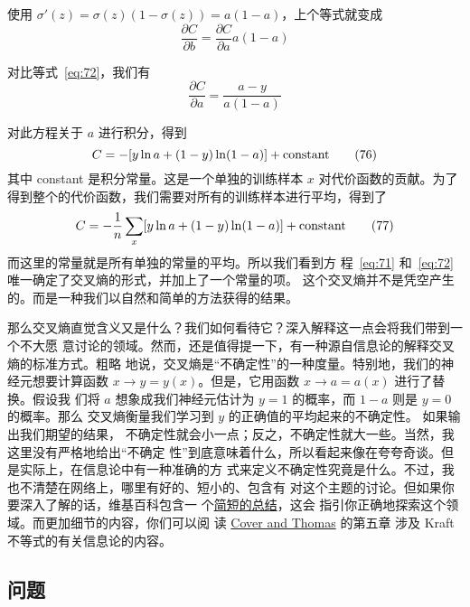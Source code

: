 使用 $\sigma'(z) = \sigma(z)(1-\sigma(z)) = a(1-a)$，上个等式就变成
\begin{equation}
  \frac{\partial C}{\partial b} = \frac{\partial C}{\partial a}
  a(1-a)
  \label{eq:74}\tag{74}
\end{equation}

对比等式~\eqref{eq:72}，我们有
\begin{equation}
  \frac{\partial C}{\partial a} = \frac{a-y}{a(1-a)}
  \label{eq:75}\tag{75}
\end{equation}

对此方程关于 $a$ 进行积分，得到
\begin{equation}
  C = -[y \ln a + (1-y) \ln (1-a)]+ {\rm constant}
  \label{eq:76}\tag{76}
\end{equation}
其中 {\rm constant} 是积分常量。这是一个单独的训练样本 $x$ 对代价函数的贡献。为了
得到整个的代价函数，我们需要对所有的训练样本进行平均，得到了
\begin{equation}
  C = -\frac{1}{n} \sum_x [y \ln a +(1-y) \ln(1-a)] + {\rm constant}
  \label{eq:77}\tag{77}
\end{equation}
而这里的常量就是所有单独的常量的平均。所以我们看到方
程~\eqref{eq:71} 和~\eqref{eq:72} 唯一确定了交叉熵的形式，并加上了一个常量的项。
这个交叉熵并不是凭空产生的。而是一种我们以自然和简单的方法获得的结果。

那么交叉熵直觉含义又是什么？我们如何看待它？深入解释这一点会将我们带到一个不大愿
意讨论的领域。然而，还是值得提一下，有一种源自信息论的解释交叉熵的标准方式。粗略
地说，交叉熵是``不确定性''的一种度量。特别地，我们的神经元想要计算函数 $x
\rightarrow y = y(x)$。但是，它用函数 $x \rightarrow a = a(x)$ 进行了替换。假设我
们将 $a$ 想象成我们神经元估计为 $y = 1$ 的概率，而 $1-a$ 则是 $y=0$ 的概率。那么
交叉熵衡量我们学习到 $y$ 的正确值的平均起来的不确定性。 如果输出我们期望的结果，
不确定性就会小一点；反之，不确定性就大一些。当然，我这里没有严格地给出``不确定
性''到底意味着什么，所以看起来像在夸夸奇谈。但是实际上，在信息论中有一种准确的方
式来定义不确定性究竟是什么。不过，我也不清楚在网络上，哪里有好的、短小的、包含有
对这个主题的讨论。但如果你要深入了解的话，维基百科包含一
个\href{http://en.wikipedia.org/wiki/Cross_entropy#Motivation}{简短的总结}，这会
指引你正确地探索这个领域。而更加细节的内容，你们可以阅
读 \href{http://books.google.ca/books?id=VWq5GG6ycxMC}{Cover and Thomas} 的第五章
涉及 Kraft 不等式的有关信息论的内容。

\subsection*{问题}

